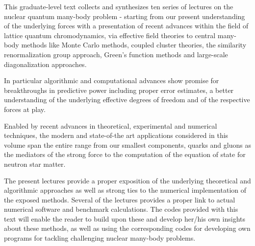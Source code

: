 \preface
This graduate-level text collects and synthesizes ten series of
lectures on the nuclear quantum many-body problem - starting from our
present understanding of the underlying forces with a presentation of
recent advances within the field of lattice quantum chromodynamics,
via effective field theories to central many-body methods like Monte
Carlo methods, coupled cluster theories, the similarity renormalization group approach, Green's function methods 
and large-scale
diagonalization approaches.

In particular algorithmic and computational advances show promise for
breakthroughs in predictive power including proper error estimates, a
better understanding of the underlying effective degrees of freedom
and of the respective forces at play.

Enabled by recent advances in theoretical, experimental and numerical
techniques, the modern and state-of-the art applications considered in
this volume span the entire range from our smallest components, quarks
and gluons as the mediators of the strong force to the computation of
the equation of state for neutron star matter.

 

The present lectures provide a proper exposition of the underlying
theoretical and algorithmic approaches as well as strong ties to the
numerical implementation of the exposed methods. Several of the
lectures provides a proper link to actual numerical software and benchmark calculations. The
codes provided with this text will enable the reader to build upon these and develop her/his
own insights about these methods, as well as using the corresponding
codes for developing own programs for tackling challenging nuclear
many-body problems.

